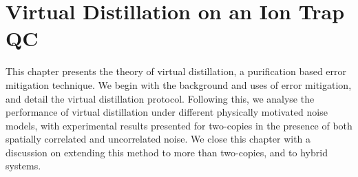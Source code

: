 \chapter{Virtual Distillation on an Ion Trap QC}
\label{ch:virtual_distillation}
\minitoc

This chapter presents the theory of virtual distillation, a purification based
error mitigation technique. We begin with the background and uses of error
mitigation, and detail the virtual distillation protocol. Following this, we
analyse the performance of virtual distillation under different physically
motivated noise models, with experimental results presented for two-copies in
the presence of both spatially correlated and uncorrelated noise. We close this
chapter with a discussion on extending this method to more than two-copies, and
to hybrid systems.

